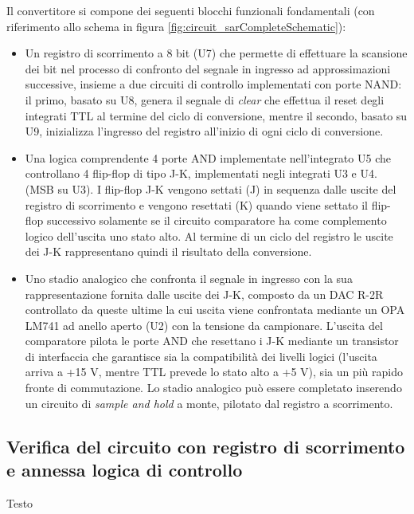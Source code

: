 \documentclass[journal]{IEEEtran}
\begin{document}
Il convertitore si compone dei seguenti blocchi funzionali fondamentali (con riferimento allo schema in figura \ref{fig:circuit_sarCompleteSchematic}):
\begin{itemize}
    \item Un registro di scorrimento a 8 bit (U7) che permette di effettuare la scansione dei bit nel processo di confronto del segnale in ingresso ad approssimazioni successive, insieme a due circuiti di controllo implementati con porte NAND: il primo, basato su U8, genera il segnale di \textit{clear} che effettua il reset degli integrati TTL al termine del ciclo di conversione, mentre il secondo, basato su U9, inizializza l'ingresso del registro all'inizio di ogni ciclo di conversione.
    \item Una logica comprendente 4 porte AND implementate nell'integrato U5 che controllano 4 flip-flop di tipo J-K, implementati negli integrati U3 e U4. (MSB su U3). I flip-flop J-K vengono settati (J) in sequenza dalle uscite del registro di scorrimento e vengono resettati (K) quando viene settato il flip-flop successivo solamente se il circuito comparatore ha come complemento logico dell'uscita uno stato alto. Al termine di un ciclo del registro le uscite dei J-K rappresentano quindi il risultato della conversione.
    \item Uno stadio analogico che confronta il segnale in ingresso con la sua rappresentazione fornita dalle uscite dei J-K, composto da un DAC R-2R controllato da queste ultime la cui uscita viene confrontata mediante un OPA LM741 ad anello aperto (U2) con la tensione da campionare. L'uscita del comparatore pilota le porte AND che resettano i J-K mediante un transistor di interfaccia che garantisce sia la compatibilità dei livelli logici (l'uscita arriva a +15 V, mentre TTL prevede lo stato alto a +5 V), sia un più rapido fronte di commutazione. Lo stadio analogico può essere completato inserendo un circuito di \textit{sample and hold} a monte, pilotato dal registro a scorrimento.
\end{itemize}

\subsection{Verifica del circuito con registro di scorrimento e annessa logica di controllo}
Testo
\end{document}
